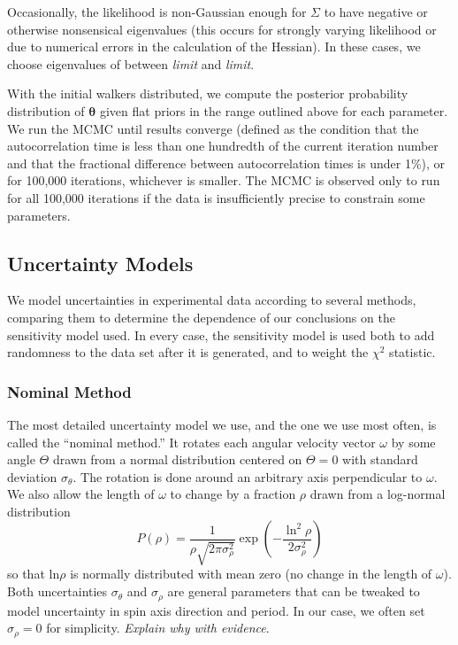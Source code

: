 \documentclass{aastex631}
\newcommand{\parens}[1]{\left( #1 \right)}
\newcommand{\jtd}[1]{{\color{red}\textit{#1}}}
\begin{document}
Occasionally, the likelihood is non-Gaussian enough for $\Sigma$ to have negative or otherwise nonsensical eigenvalues (this occurs for strongly varying likelihood or due to numerical errors in the calculation of the Hessian). In these cases, we choose eigenvalues of between \jtd{limit} and \jtd{limit}.

With the initial walkers distributed, we compute the posterior probability distribution of $\mathbf \theta$ given flat priors in the range outlined above for each parameter. We run the MCMC until results converge (defined as the condition that the autocorrelation time is less than one hundredth of the current iteration number and that the fractional difference between autocorrelation times is under 1\%), or for 100,000 iterations, whichever is smaller. The MCMC is observed only to run for all 100,000 iterations if the data is insufficiently precise to constrain some parameters.


\subsection{Uncertainty Models}
\label{sec:uncertainty-models}
We model uncertainties in experimental data according to several methods, comparing them to determine the dependence of our conclusions on the sensitivity model used. In every case, the sensitivity model is used both to add randomness to the data set after it is generated, and to weight the $\chi^2$ statistic.

\subsubsection{Nominal Method}
The most detailed uncertainty model we use, and the one we use most often, is called the ``nominal method.'' It rotates each angular velocity vector $\omega$ by some angle $\Theta$ drawn from a normal distribution centered on $\Theta=0$ with standard deviation $\sigma_\theta$. The rotation is done around an arbitrary axis perpendicular to $\omega$. We also allow the length of $\omega$ to change by a fraction $\rho$ drawn from a log-normal distribution
\begin{equation}
  P(\rho) = \frac{1}{\rho\sqrt{2\pi \sigma_\rho^2}} \mathrm{\exp}\parens{-\frac{\ln^2\rho}{2\sigma_\rho^2}}
\end{equation}
so that $\mathrm{ln} \rho$ is normally distributed with mean zero (no change in the length of $\omega$). Both uncertainties $\sigma_\theta$ and $\sigma_\rho$ are general parameters that can be tweaked to model uncertainty in spin axis direction and period. In our case, we often set $\sigma_\rho = 0$ for simplicity. \jtd{Explain why with evidence}.
\end{document}
